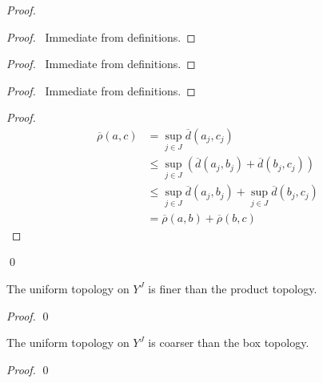 \begin{proof}
    \pf
    \begin{proof}
        \pf\ Immediate from definitions.
    \end{proof}
    \begin{proof}
        \pf\ Immediate from definitions.
    \end{proof}
    \begin{proof}
        \pf\ Immediate from definitions.
    \end{proof}
    \begin{proof}
        \pf
        \begin{align*}
            \overline{\rho}(a,c) & = \sup_{j \in J} \overline{d}(a_j, c_j) \\
            & \leq \sup_{j \in J} (\overline{d}(a_j, b_j) + \overline{d}(b_j, c_j)) \\ 
            & \leq \sup_{j \in J} \overline{d}(a_j, b_j) + \sup_{j \in J} \overline{d}(b_j, c_j) \\
            & = \overline{\rho}(a,b) + \overline{\rho}(b,c)
        \end{align*}
    \end{proof}
    \qed
\end{proof}

\begin{proposition}
    The uniform topology on $Y^J$ is finer than the product topology.
\end{proposition}

\begin{proof}
    \pf
    \qed
\end{proof}

\begin{proposition}
    The uniform topology on $Y^J$ is coarser than the box topology.
\end{proposition}

\begin{proof}
    \pf
    \qed
\end{proof}


